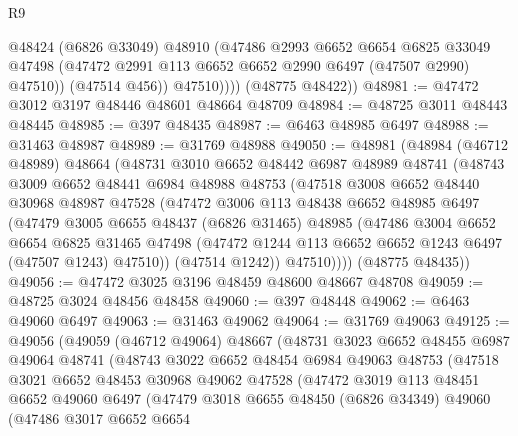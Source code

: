 \begin{lexlean}{R9}
\begin{coremodule}
                @48424
                (@6826 @33049)
                @48910
                (@47486
                  @2993
                  @6652
                  @6654
                  @6825
                  @33049
                  @47498
                  (@47472 @2991 @113 @6652 @6652 @2990 @6497 (@47507 @2990) @47510))
                (@47514 @456))
              @47510))))
      (@48775 @48422))
@48981 := @47472 @3012 @3197 @48446 @48601 @48664 @48709
@48984 := @48725 @3011 @48443 @48445
@48985 := @397 @48435
@48987 := @6463 @48985 @6497
@48988 := @31463 @48987
@48989 := @31769 @48988
@49050 := @48981
    (@48984
      (@46712 @48989)
      @48664
      (@48731
        @3010
        @6652
        @48442
        @6987
        @48989
        @48741
        (@48743
          @3009
          @6652
          @48441
          @6984
          @48988
          @48753
          (@47518
            @3008
            @6652
            @48440
            @30968
            @48987
            @47528
            (@47472
              @3006
              @113
              @48438
              @6652
              @48985
              @6497
              (@47479
                @3005
                @6655
                @48437
                (@6826 @31465)
                @48985
                (@47486
                  @3004
                  @6652
                  @6654
                  @6825
                  @31465
                  @47498
                  (@47472 @1244 @113 @6652 @6652 @1243 @6497 (@47507 @1243) @47510))
                (@47514 @1242))
              @47510))))
      (@48775 @48435))
@49056 := @47472 @3025 @3196 @48459 @48600 @48667 @48708
@49059 := @48725 @3024 @48456 @48458
@49060 := @397 @48448
@49062 := @6463 @49060 @6497
@49063 := @31463 @49062
@49064 := @31769 @49063
@49125 := @49056
    (@49059
      (@46712 @49064)
      @48667
      (@48731
        @3023
        @6652
        @48455
        @6987
        @49064
        @48741
        (@48743
          @3022
          @6652
          @48454
          @6984
          @49063
          @48753
          (@47518
            @3021
            @6652
            @48453
            @30968
            @49062
            @47528
            (@47472
              @3019
              @113
              @48451
              @6652
              @49060
              @6497
              (@47479
                @3018
                @6655
                @48450
                (@6826 @34349)
                @49060
                (@47486
                  @3017
                  @6652
                  @6654

\end{coremodule}
\end{lexlean}
